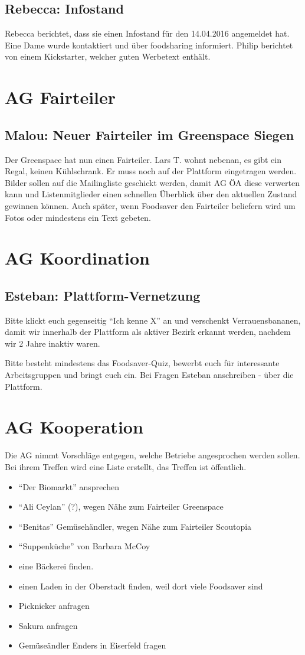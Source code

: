 \documentclass{scrreprt}
\begin{document}
\subsection{Rebecca: Infostand}
Rebecca berichtet, dass sie einen Infostand für den 14.04.2016 angemeldet hat. Eine Dame wurde kontaktiert und über foodsharing informiert. Philip berichtet von einem Kickstarter, welcher guten Werbetext enthält. 
\section{AG Fairteiler}
\subsection{Malou: Neuer Fairteiler im Greenspace Siegen}
Der Greenspace hat nun einen Fairteiler. Lars T. wohnt nebenan, es gibt ein Regal, keinen Kühlschrank. Er muss noch auf der Plattform eingetragen werden. Bilder sollen auf die Mailingliste geschickt werden, damit AG ÖA diese verwerten kann und Listenmitglieder einen schnellen Überblick über den aktuellen Zustand gewinnen können. Auch später, wenn Foodsaver den Fairteiler beliefern wird um Fotos oder mindestens ein Text gebeten.
\section{AG Koordination}
\subsection{Esteban: Plattform-Vernetzung}
Bitte klickt euch gegenseitig \enquote{Ich kenne X} an und verschenkt Verrauensbananen, damit wir innerhalb der Plattform als aktiver Bezirk erkannt werden, nachdem wir 2 Jahre inaktiv waren.\par
Bitte besteht mindestens das Foodsaver-Quiz, bewerbt euch für interessante Arbeitsgruppen und bringt euch ein. Bei Fragen Esteban anschreiben - über die Plattform. 
\section{AG Kooperation}
Die AG nimmt Vorschläge entgegen, welche Betriebe angesprochen werden sollen. Bei ihrem Treffen wird eine Liste erstellt, das Treffen ist öffentlich.
\begin{itemize}
	\item \enquote{Der Biomarkt} ansprechen
	\item \enquote{Ali Ceylan} (?), wegen Nähe zum Fairteiler Greenspace
	\item \enquote{Benitas} Gemüsehändler, wegen Nähe zum Fairteiler Scoutopia
	\item \enquote{Suppenküche} von Barbara McCoy
	\item eine Bäckerei finden. 
	\item einen Laden in der Oberstadt finden, weil dort viele Foodsaver sind
	\item Picknicker anfragen
	\item Sakura anfragen
	\item Gemüseändler Enders in Eiserfeld fragen
\end{itemize}
\end{document}
